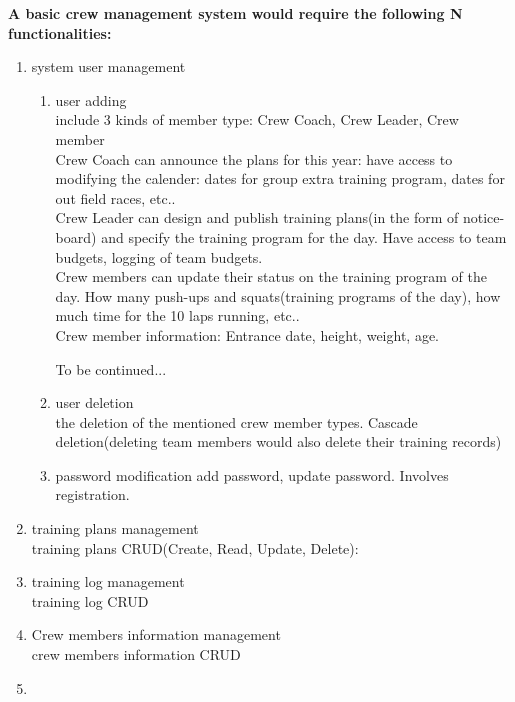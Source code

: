 \textbf{A basic crew management system would require the following N functionalities:}
\begin{enumerate}
\item
  {system user management
    \begin{enumerate}
    \item{user adding\\
        include 3 kinds of member type: Crew Coach, Crew Leader, Crew member\\
        
        Crew Coach can announce the plans for this year: have access to
        modifying the calender: dates for group extra training program, dates for out
        field races, etc..\\
        
        Crew Leader can design and publish training plans(in the form of
        notice-board) and specify the training program for the day. Have access
        to team budgets, logging of team budgets.\\
        
        Crew members can update their status on the training program of the day.
        How many push-ups and squats(training programs of the day), how much time
        for the 10 laps running, etc..\\

        Crew member information: Entrance date, height, weight, age.
        
        To be continued...
        }
      \item{user deletion\\
          the deletion of the mentioned crew member types. Cascade deletion(deleting
          team members would also delete their training records)
        }
      \item{password modification
          add password, update password. Involves registration.\\
        }
    \end{enumerate}
  }

\item{training plans management\\
    training plans CRUD(Create, Read, Update, Delete):
  }

\item {
    training log management\\
    training log CRUD
  }

\item {
    Crew members information management\\
    crew members information CRUD
  }

\item {
    
  }
  
\end{enumerate}

